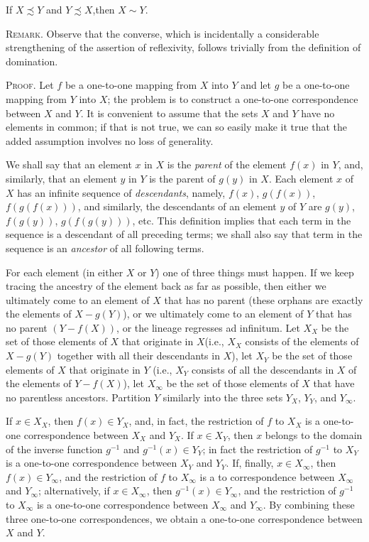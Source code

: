 \begin{named} If $X \precsim Y$ and $Y \precsim X$,then $X \sim Y$.
\end{named}

\textsc{Remark}. Observe that the converse, which is incidentally a considerable strengthening of the assertion of reflexivity, follows trivially from the definition of domination. 

\textsc{Proof}. Let $f$ be a one-to-one mapping from $X$ into $Y$ and let $g$ be a one-to-one mapping from $Y$ into $X$; the problem is to construct a one-to-one correspondence between $X$ and $Y$. It is convenient to assume that the sets $X$ and $Y$ have no elements in common; if that is not true, we can so easily make it true that the added assumption  involves no loss of generality. 

We shall say that an element $x$ in $X$ is the \textit{parent} of the element $f(x)$ in $Y$, and, similarly, that an element $y$ in $Y$ is the parent of $g(y)$ in $X$. Each element $x$ of $X$ has an infinite sequence of \textit{descendants}, namely, $f(x)$, $g(f(x))$, $f(g(f(x)))$, and similarly, the descendants of an element $y$ of $Y$ are $g(y)$, $f(g(y))$, $g(f(g(y)))$, etc. This definition implies that each term in the sequence is a descendant of all preceding terms; we shall also say that term in the sequence is an \textit{ancestor} of all following terms. 

For each element (in either $X$ or $Y$) one of three things must happen. If we keep tracing the ancestry of the element back as far as possible, then either we ultimately come to an element of $X$ that has no parent (these orphans are exactly the elements of $X - g(Y)$), or we ultimately come to an element of $Y$ that has no parent $(Y - f(X))$, or the lineage regresses ad infinitum. Let $X_{X}$ be the set of those elements of $X$ that originate in $X$(i.e., $X_{X}$ consists of the elements of $X - g(Y)$ together with all their descendants in $X$), let $X_{Y}$ be the set of those elements of $X$ that originate in $Y$ (i.e., $X_{Y}$ consists of all the descendants in $X$ of the elements of $Y - f(X)$), let $X_{\infty}$ be the set of those elements of $X$ that have no parentless ancestors. Partition $Y$ similarly into the three sets $Y_{X}$, $Y_{Y}$, and $Y_{\infty}$. 

If $x \in X_{X}$, then $f(x) \in Y_{X}$, and, in fact, the restriction of $f$ to $X_{X}$ is a one-to-one correspondence between $X_{X}$ and $Y_{X}$. If $x \in X_{Y}$, then $x$ belongs to the domain of the inverse function $g^{-1}$ and $g^{-1}(x) \in Y_{Y}$; in fact the restriction of $g^{-1}$ to $X_{Y}$ is a one-to-one correspondence between $X_{Y}$ and $Y_{Y}$. If, finally, $x \in X_{\infty}$, then $f(x) \in Y_{\infty}$, and the restriction of $f$ to $X_{\infty}$ is a to correspondence between $X_{\infty}$ and  $Y_{\infty}$; alternatively, if $x \in X_{\infty}$, then $g^{-1}(x) \in Y_{\infty}$, and the restriction of $g^{-1}$ to $X_{\infty}$ is a one-to-one correspondence between $X_{\infty}$ and $Y_{\infty}$. By combining these three one-to-one correspondences, we obtain a one-to-one correspondence between $X$ and $Y$. 

